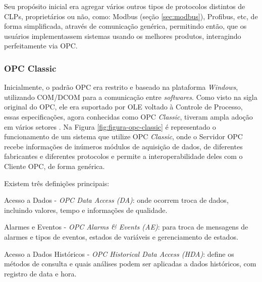         Seu propósito inicial era agregar vários outros tipos de protocolos distintos de \glspl{CLP}, proprietários ou não, como: Modbus (seção \ref{sec:modbus}), Profibus, etc, de forma simplificada, através de comunicação genérica, permitindo então, que os usuários implementassem sistemas usando os melhores produtos, interagindo perfeitamente via \gls{OPC}.

    \subsubsection{OPC Classic}
    \label{sec:opc-classic}

        Inicialmente, o padrão \gls{OPC} era restrito e baseado na plataforma \textit{Windows}, utilizando \gls{COM/DCOM} para a comunicação entre \textit{softwares}. Como visto na sigla original do \gls{OPC}, ele era suportado por \gls{OLE} voltado à Controle de Processo, essas especificações, agora conhecidas como \gls{OPC} \textit{Classic}, tiveram ampla adoção em vários setores \cite{OPCClassic}. Na Figura \ref{fig:figura-opc-classic} é representado o funcionamento de um sistema que utilize \gls{OPC} \textit{Classic}, onde o Servidor \gls{OPC} recebe informações de inúmeros módulos de aquisição de dados, de diferentes fabricantes e diferentes protocolos e permite a interoperabilidade deles com o Cliente \gls{OPC}, de forma genérica.
                
        \begin{figure}[!h]
	    \end{figure}
	    
	    \quad
	    
	    Existem três definições principais:
        
        \begin{alineascomponto}
        	\item Acesso a Dados - \textit{\gls{OPC} Data Access (DA)}: onde ocorrem troca de dados, incluindo valores, tempo e informações de qualidade.
        	\item Alarmes e Eventos - \textit{\gls{OPC} Alarms \& Events (AE)}: para troca de mensagens de alarmes e tipos de eventos, estados de variáveis e gerenciamento de estados.
        	\item Acesso a Dados Históricos - \textit{\gls{OPC} Historical Data Access (HDA)}: define os métodos de consulta e quais análises podem ser aplicadas a dados históricos, com registro de data e hora.
        \end{alineascomponto}

